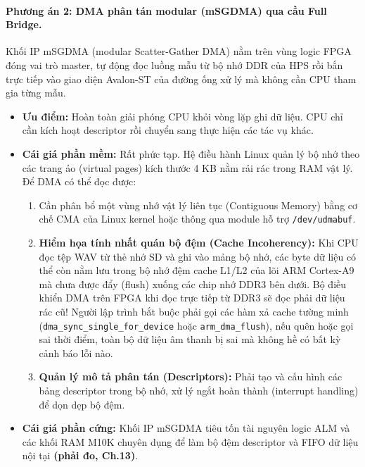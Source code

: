 \paragraph{Phương án 2: DMA phân tán modular (mSGDMA) qua cầu Full Bridge.}
Khối IP mSGDMA (modular Scatter-Gather DMA) nằm trên vùng logic FPGA đóng vai trò master, tự động đọc luồng mẫu từ bộ nhớ DDR của HPS rồi bắn trực tiếp vào giao diện Avalon-ST của đường ống xử lý mà không cần CPU tham gia từng mẫu.
\begin{itemize}[leftmargin=1.5em, itemsep=2pt]
    \item \textbf{Ưu điểm:} Hoàn toàn giải phóng CPU khỏi vòng lặp ghi dữ liệu. CPU chỉ cần kích hoạt descriptor rồi chuyển sang thực hiện các tác vụ khác.
    \item \textbf{Cái giá phần mềm:} Rất phức tạp. Hệ điều hành Linux quản lý bộ nhớ theo các trang ảo (virtual pages) kích thước 4 KB nằm rải rác trong RAM vật lý. Để DMA có thể đọc được:
    \begin{enumerate}[leftmargin=1.2em, itemsep=2pt]
        \item Cần phân bổ một vùng nhớ vật lý liên tục (Contiguous Memory) bằng cơ chế CMA của Linux kernel hoặc thông qua module hỗ trợ \texttt{/dev/udmabuf}.
        \item \textbf{Hiểm họa tính nhất quán bộ đệm (Cache Incoherency):} Khi CPU đọc tệp WAV từ thẻ nhớ SD và ghi vào mảng bộ nhớ, các byte dữ liệu có thể còn nằm lưu trong bộ nhớ đệm cache L1/L2 của lõi ARM Cortex-A9 mà chưa được đẩy (flush) xuống các chip nhớ DDR3 bên dưới. Bộ điều khiển DMA trên FPGA khi đọc trực tiếp từ DDR3 sẽ đọc phải dữ liệu rác cũ! Người lập trình bắt buộc phải gọi các hàm xả cache tường minh (\texttt{dma\_sync\_single\_for\_device} hoặc \texttt{arm\_dma\_flush}), nếu quên hoặc gọi sai thời điểm, toàn bộ dữ liệu âm thanh bị sai mà không hề có bất kỳ cảnh báo lỗi nào.
        \item \textbf{Quản lý mô tả phân tán (Descriptors):} Phải tạo và cấu hình các bảng descriptor trong bộ nhớ, xử lý ngắt hoàn thành (interrupt handling) để dọn dẹp bộ đệm.
    \end{enumerate}
    \item \textbf{Cái giá phần cứng:} Khối IP mSGDMA tiêu tốn tài nguyên logic ALM và các khối RAM M10K chuyên dụng để làm bộ đệm descriptor và FIFO dữ liệu nội tại \textbf{(phải đo, Ch.13)}.
\end{itemize}

